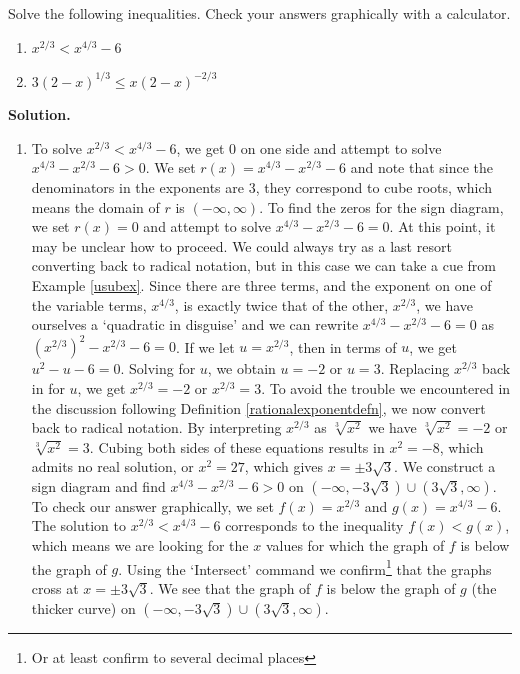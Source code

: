\begin{ex}  Solve the following inequalities.  Check your answers graphically with a calculator.

\begin{multicols}{2}
\begin{enumerate}

\item $x^{2/3} < x^{4/3} - 6$

\item  $3 (2-x)^{1/3} \leq x (2-x)^{-2/3}$

\end{enumerate}
\end{multicols}

{\bf Solution.}  

\begin{enumerate}

\item  To solve $x^{2/3} < x^{4/3} - 6$, we get $0$ on one side and attempt to solve $x^{4/3} - x^{2/3} - 6 > 0$.  We set $r(x) = x^{4/3} - x^{2/3} - 6$ and note that since the denominators in the exponents are $3$, they correspond to cube roots, which means the domain of $r$ is $(-\infty, \infty)$. To find the zeros for the sign diagram, we set $r(x) = 0$ and attempt to solve $x^{4/3} - x^{2/3} - 6 = 0$.  At this point, it may be unclear how to proceed.  We could always try as a last resort converting back to radical notation,  but in this case we can take a cue from Example \ref{usubex}.  Since there are three terms, and the exponent on one of the variable terms, $x^{4/3}$, is exactly twice that of the other, $x^{2/3}$, we have ourselves a `quadratic in disguise' and we can rewrite  $ x^{4/3} - x^{2/3} - 6 = 0$ as $\left(x^{2/3}\right)^2 - x^{2/3} - 6=0$.  If we let $u = x^{2/3}$, then in terms of $u$, we get $u^2 - u - 6 = 0$.  Solving for $u$, we obtain $u = -2$ or $u = 3$.  Replacing $x^{2/3}$ back in for $u$, we get $x^{2/3} = -2$ or $x^{2/3} = 3$.  To avoid the trouble we encountered in the discussion following Definition \ref{rationalexponentdefn}, we now convert back to radical notation.  By interpreting $x^{2/3}$ as $\sqrt[3]{x^2}$ we have $\sqrt[3]{x^2} = -2$ or $\sqrt[3]{x^2}= 3$.  Cubing both sides of these equations results in $x^2 = -8$, which admits no real solution, or $x^2 = 27$, which gives $x = \pm 3 \sqrt{3}$.  We construct a sign diagram and find $x^{4/3} - x^{2/3} - 6 > 0$ on $\left(-\infty, -3 \sqrt{3}\right)\cup \left(3 \sqrt{3}, \infty\right)$.  To check our answer graphically, we set $f(x) = x^{2/3}$ and $g(x) = x^{4/3}-6$.  The solution to  $x^{2/3} < x^{4/3} - 6$ corresponds to the inequality $f(x) < g(x)$, which means we are looking for the $x$ values for which the graph of $f$ is below the graph of $g$.  Using the `Intersect' command we confirm\footnote{Or at least confirm to several decimal places} that the graphs cross at $x= \pm 3\sqrt{3}$.  We see that the graph of $f$ is below the graph of $g$ (the thicker curve) on $\left(-\infty, -3 \sqrt{3}\right)\cup \left(3 \sqrt{3}, \infty\right)$.


\end{enumerate}
\end{ex}
